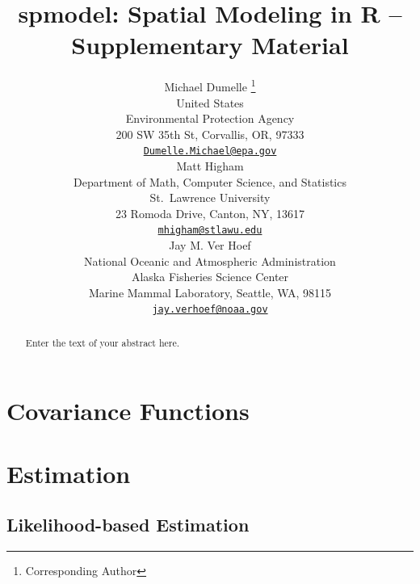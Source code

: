 \documentclass{article}
\title{spmodel: Spatial Modeling in \textbf{R} -- Supplementary Material}
\author{
    Michael Dumelle
    \thanks{Corresponding Author}
   \\
    United States \\
    Environmental Protection Agency \\
  200 SW 35th St, Corvallis, OR, 97333 \\
  \texttt{\href{mailto:Dumelle.Michael@epa.gov}{\nolinkurl{Dumelle.Michael@epa.gov}}} \\
   \And
    Matt Higham
   \\
    Department of Math, Computer Science, and Statistics \\
    St.~Lawrence University \\
  23 Romoda Drive, Canton, NY, 13617 \\
  \texttt{\href{mailto:mhigham@stlawu.edu}{\nolinkurl{mhigham@stlawu.edu}}} \\
   \And
    Jay M. Ver Hoef
   \\
    National Oceanic and Atmospheric Administration \\
    Alaska Fisheries Science Center \\
  Marine Mammal Laboratory, Seattle, WA, 98115 \\
  \texttt{\href{mailto:jay.verhoef@noaa.gov}{\nolinkurl{jay.verhoef@noaa.gov}}} \\
  }
\begin{document}
\maketitle


\begin{abstract}
Enter the text of your abstract here.
\end{abstract}


\hypertarget{covariance-functions}{%
\section{Covariance Functions}\label{covariance-functions}}

\hypertarget{estimation}{%
\section{Estimation}\label{estimation}}

\hypertarget{likelihood-based-estimation}{%
\subsection{Likelihood-based
Estimation}\label{likelihood-based-estimation}}
\end{document}
